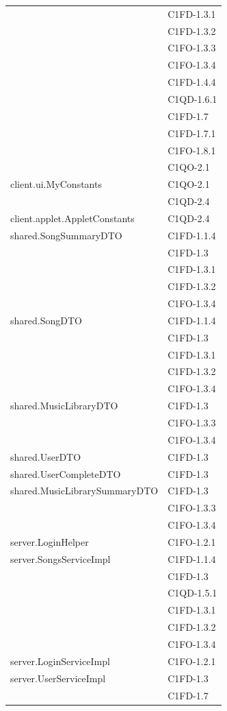 \begin{footnotesize}
\begin{longtable}[!h]{|l|l|}
& C1FD-1.3.1\\ 
& C1FD-1.3.2\\
& C1FO-1.3.3\\
& C1FO-1.3.4\\
& C1FD-1.4.4\\
& C1QD-1.6.1\\
& C1FD-1.7\\
& C1FD-1.7.1\\
& C1FO-1.8.1\\
& C1QO-2.1\\\hline 
client.ui.MyConstants  &  C1QO-2.1 \\
& C1QD-2.4 \\\hline  
client.applet.AppletConstants  &  C1QD-2.4\\\hline 
shared.SongSummaryDTO  &  C1FD-1.1.4\\
& C1FD-1.3\\
& C1FD-1.3.1\\
& C1FD-1.3.2\\
& C1FO-1.3.4\\\hline
shared.SongDTO  &  C1FD-1.1.4\\
& C1FD-1.3\\
& C1FD-1.3.1\\
& C1FD-1.3.2\\
& C1FO-1.3.4\\\hline 
shared.MusicLibraryDTO  &  C1FD-1.3\\
& C1FO-1.3.3\\
& C1FO-1.3.4\\\hline 
shared.UserDTO  &  C1FD-1.3 \\\hline  
shared.UserCompleteDTO  &  C1FD-1.3 \\\hline 
shared.MusicLibrarySummaryDTO  &  C1FD-1.3\\
& C1FO-1.3.3\\
& C1FO-1.3.4\\\hline  
server.LoginHelper  &  C1FO-1.2.1 \\\hline 
server.SongsServiceImpl  &  C1FD-1.1.4\\
& C1FD-1.3\\
& C1QD-1.5.1\\
& C1FD-1.3.1\\
& C1FD-1.3.2\\
& C1FO-1.3.4\\\hline 
server.LoginServiceImpl  &  C1FO-1.2.1\\\hline 
server.UserServiceImpl  &  C1FD-1.3 \\
& C1FD-1.7\\

\end{longtable}
\end{footnotesize}
